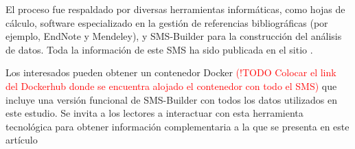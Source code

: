 El proceso fue respaldado por diversas herramientas informáticas, como hojas de cálculo, software especializado en la gestión de referencias bibliográficas (por ejemplo, EndNote y Mendeley), y SMS-Builder \cite{sms-builder-repo} para la construcción del análisis de datos. Toda la información de este SMS ha sido publicada en el sitio \cite{sms-builder-own-container}.

Los interesados pueden obtener un contenedor Docker \textcolor{red}{(!TODO Colocar el link del Dockerhub donde se encuentra alojado el contenedor con todo el SMS)} que incluye una versión funcional de SMS-Builder con todos los datos utilizados en este estudio. Se invita a los lectores a interactuar con esta herramienta tecnológica para obtener información complementaria a la que se presenta en este artículo
